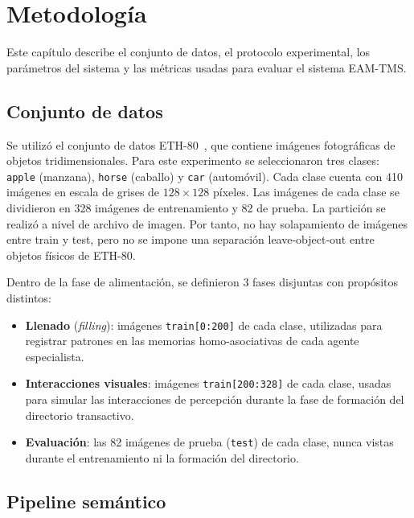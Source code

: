 \section{Metodología}
\label{sec:metodologia}

Este capítulo describe el conjunto de datos, el protocolo experimental, los parámetros del sistema y las métricas usadas para evaluar el sistema EAM-TMS.

\subsection{Conjunto de datos}
\label{sec:dataset}

Se utilizó el conjunto de datos ETH-80~\cite{leibe2003eth80}, que contiene imágenes fotográficas de objetos tridimensionales.
Para este experimento se seleccionaron tres clases: \texttt{apple} (manzana), \texttt{horse} (caballo) y \texttt{car} (automóvil).
Cada clase cuenta con 410 imágenes en escala de grises de $128\times128$ píxeles.
Las imágenes de cada clase se dividieron en 328 imágenes de entrenamiento y 82 de prueba.
La partición se realizó a nivel de archivo de imagen.
Por tanto, no hay solapamiento de imágenes entre train y test, pero no se impone una separación leave-object-out entre objetos físicos de ETH-80.

Dentro de la fase de alimentación, se definieron 3 fases disjuntas con propósitos distintos:
\begin{itemize}
    \item \textbf{Llenado} (\textit{filling}): imágenes \texttt{train[0:200]} de cada clase, utilizadas para registrar patrones en las memorias homo-asociativas de cada agente especialista.
    \item \textbf{Interacciones visuales}: imágenes \texttt{train[200:328]} de cada clase, usadas para simular las interacciones de percepción durante la fase de formación del directorio transactivo.
    \item \textbf{Evaluación}: las 82 imágenes de prueba (\texttt{test}) de cada clase, nunca vistas durante el entrenamiento ni la formación del directorio.
\end{itemize}

\subsection{Pipeline semántico}
\label{sec:pipeline-semantico}

